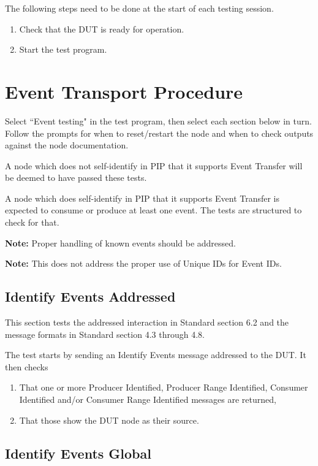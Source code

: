 \documentclass[11pt]{article}
\begin{document}
The following steps need to be done at the start of each testing session.
\begin{enumerate}
\item Check that the DUT is ready for operation.
\item Start the test program.
\end{enumerate}

\section{Event Transport Procedure}

Select ``Event testing" in the test program, 
then select each section below in turn.  Follow the prompts
for when to reset/restart the node and when to check 
outputs against the node documentation.

A node which does not self-identify in PIP that it supports
Event Transfer will be deemed to have passed these tests.

A node which does self-identify in PIP that it supports 
Event Transfer is expected to consume or produce at least 
one event.  The tests are structured to check for that.

\textbf{Note:}  Proper handling of known events should be addressed.

\textbf{Note:}  This does not address the proper use of Unique IDs for Event IDs.

\subsection{Identify Events Addressed}

This section tests the addressed interaction in Standard section 6.2 and
the message formats in Standard section 4.3 through 4.8.

The test starts by sending an Identify Events message addressed to the DUT.
It then checks

\begin{enumerate}
\item That one or more Producer Identified, Producer Range Identified, 
        Consumer Identified and/or Consumer Range Identified messages are returned,
\item That those show the DUT node as their source.
\end{enumerate}

\subsection{Identify Events Global}
\end{document}
